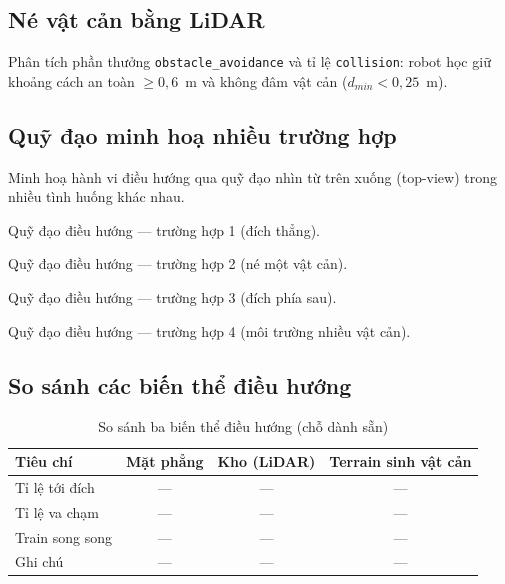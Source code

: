 \subsection{Né vật cản bằng LiDAR}
\label{subsec:nav_obstacle}

Phân tích phần thưởng \texttt{obstacle\_avoidance} và tỉ lệ \texttt{collision}:
robot học giữ khoảng cách an toàn $\geq 0{,}6$~m và không đâm vật cản
($d_{min} < 0{,}25$~m).

\label{fig:nav_obstacle_curve}

\subsection{Quỹ đạo minh hoạ nhiều trường hợp}
\label{subsec:nav_trajectories}

Minh hoạ hành vi điều hướng qua quỹ đạo nhìn từ trên xuống (top-view) trong
nhiều tình huống khác nhau.

%
{Quỹ đạo điều hướng — trường hợp 1 (đích thẳng).}
\label{fig:nav_case1}

%
{Quỹ đạo điều hướng — trường hợp 2 (né một vật cản).}
\label{fig:nav_case2}

%
{Quỹ đạo điều hướng — trường hợp 3 (đích phía sau).}
\label{fig:nav_case3}

%
{Quỹ đạo điều hướng — trường hợp 4 (môi trường nhiều vật cản).}
\label{fig:nav_case4}

\subsection{So sánh các biến thể điều hướng}
\label{subsec:nav_compare}

\begin{table}[H]
    \centering
    \caption{So sánh ba biến thể điều hướng (chỗ dành sẵn)}
    \label{tab:nav_compare}
    \renewcommand{\arraystretch}{1.3}
    \begin{tabular}{lccc}
        \toprule
        \textbf{Tiêu chí} & \textbf{Mặt phẳng} & \textbf{Kho (LiDAR)} & \textbf{Terrain sinh vật cản} \\
        \midrule
        Tỉ lệ tới đích        & --- & --- & --- \\
        Tỉ lệ va chạm         & --- & --- & --- \\
        Train song song       & --- & --- & --- \\
        Ghi chú               & --- & --- & --- \\
        \bottomrule
    \end{tabular}
\end{table}
